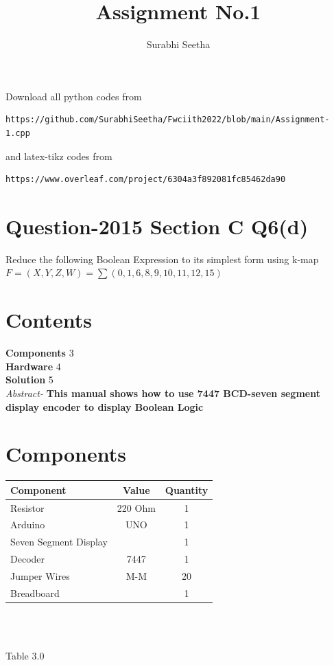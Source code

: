 \documentclass[journal,12pt,twocolumn]{IEEEtran}
\begin{document}
\title{Assignment No.1}

\author{Surabhi Seetha}
\maketitle
\newpage
\bigskip
\renewcommand{\thefigure}{\theenumi}
\renewcommand{\thetable}{\theenumi}

Download all python codes from 
\begin{lstlisting}
https://github.com/SurabhiSeetha/Fwciith2022/blob/main/Assignment-1.cpp
\end{lstlisting}
%
and latex-tikz codes from 
%
\begin{lstlisting}
https://www.overleaf.com/project/6304a3f892081fc85462da90
\end{lstlisting}
%
\section{Question-2015 Section C Q6(d)}

Reduce the following Boolean Expression to its simplest form using k-map
$F=(X,Y,Z,W)= \sum (0,1,6,8,9,10,11,12,15)$
\section{Contents}
\raggedright
\textbf{Components}
\hspace{10em} 3
\\\textbf{Hardware}
\hspace{11em} 4
\\\textbf{Solution}
\hspace{11.8em}   5\\
\textit{Abstract-}
\textbf{This manual shows how to use 7447 BCD-seven segment display encoder to display Boolean Logic}
\section{Components}
\centering
\begin{tabular}{|l|c|c|}
\hline
Component & Value & Quantity\\
\hline
Resistor & 220 Ohm & 1\\
\hline
Arduino & UNO & 1\\
\hline
Seven Segment Display & & 1\\
\hline
Decoder & 7447 & 1\\
\hline
Jumper Wires & M-M & 20\\
\hline
Breadboard & & 1\\
\hline
\end{tabular}\\
\
\centerline{Table 3.0}
\end{document}
